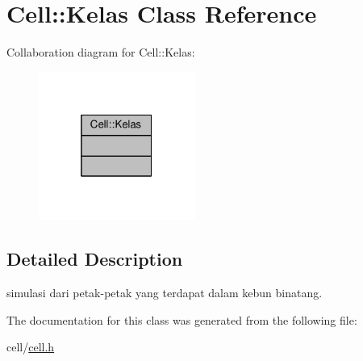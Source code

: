 \hypertarget{classCell_1_1Kelas}{}\section{Cell\+:\+:Kelas Class Reference}
\label{classCell_1_1Kelas}


Collaboration diagram for Cell\+:\+:Kelas\+:\nopagebreak
\begin{figure}[H]
\begin{center}
\leavevmode
\includegraphics[width=145pt]{classCell_1_1Kelas__coll__graph}
\end{center}
\end{figure}


\subsection{Detailed Description}
simulasi dari petak-\/petak yang terdapat dalam kebun binatang. 

The documentation for this class was generated from the following file\+:\begin{DoxyCompactItemize}
\item 
cell/\hyperlink{cell_8h}{cell.\+h}\end{DoxyCompactItemize}
